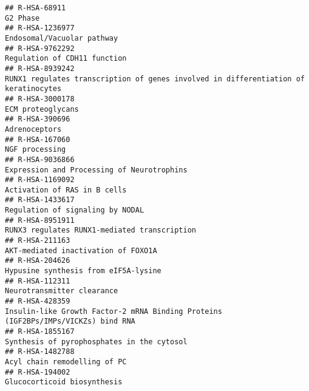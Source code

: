 \documentclass[
]{article}
\begin{document}
\begin{verbatim}
## R-HSA-68911                                                                                                                               G2 Phase
## R-HSA-1236977                                                                                                           Endosomal/Vacuolar pathway
## R-HSA-9762292                                                                                                         Regulation of CDH11 function
## R-HSA-8939242                                                  RUNX1 regulates transcription of genes involved in differentiation of keratinocytes
## R-HSA-3000178                                                                                                                    ECM proteoglycans
## R-HSA-390696                                                                                                                         Adrenoceptors
## R-HSA-167060                                                                                                                        NGF processing
## R-HSA-9036866                                                                                           Expression and Processing of Neurotrophins
## R-HSA-1169092                                                                                                         Activation of RAS in B cells
## R-HSA-1433617                                                                                                     Regulation of signaling by NODAL
## R-HSA-8951911                                                                                         RUNX3 regulates RUNX1-mediated transcription
## R-HSA-211163                                                                                                   AKT-mediated inactivation of FOXO1A
## R-HSA-204626                                                                                                  Hypusine synthesis from eIF5A-lysine
## R-HSA-112311                                                                                                            Neurotransmitter clearance
## R-HSA-428359                                                     Insulin-like Growth Factor-2 mRNA Binding Proteins (IGF2BPs/IMPs/VICKZs) bind RNA
## R-HSA-1855167                                                                                           Synthesis of pyrophosphates in the cytosol
## R-HSA-1482788                                                                                                         Acyl chain remodelling of PC
## R-HSA-194002                                                                                                           Glucocorticoid biosynthesis

\end{verbatim}
\end{document}
